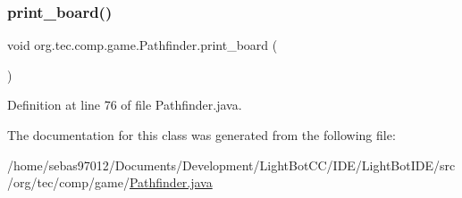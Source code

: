 \subsubsection{\texorpdfstring{print\+\_\+board()}{print\_board()}}
{\footnotesize\ttfamily void org.\+tec.\+comp.\+game.\+Pathfinder.\+print\+\_\+board (\begin{DoxyParamCaption}{ }\end{DoxyParamCaption})\hspace{0.3cm}{\ttfamily [inline]}}



Definition at line 76 of file Pathfinder.\+java.



The documentation for this class was generated from the following file\+:\begin{DoxyCompactItemize}
\item 
/home/sebas97012/\+Documents/\+Development/\+Light\+Bot\+C\+C/\+I\+D\+E/\+Light\+Bot\+I\+D\+E/src/org/tec/comp/game/\mbox{\hyperlink{_pathfinder_8java}{Pathfinder.\+java}}\end{DoxyCompactItemize}
